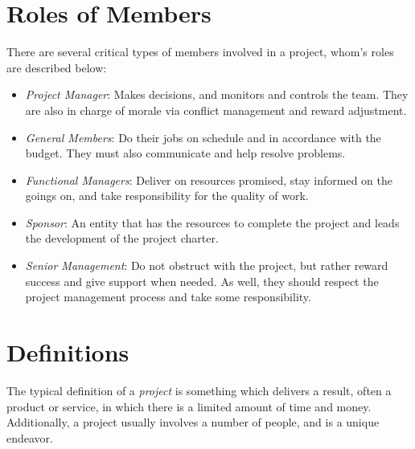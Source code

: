 \documentclass[oneside, 12pt]{book}
\begin{document}
\section{Roles of Members}
There are several critical types of members involved in a project, whom's roles are described below:
\begin{itemize}
    \item \emph{Project Manager}: Makes decisions, and monitors and controls the team. They are also in charge of morale via conflict management and reward adjustment.

    \item \emph{General Members}: Do their jobs on schedule and in accordance with the budget. They must also communicate and help resolve problems.

    \item \emph{Functional Managers}: Deliver on resources promised, stay informed on the goings on, and take responsibility for the quality of work.

    \item \emph{Sponsor}: An entity that has the resources to complete the project and leads the development of the project charter.

    \item \emph{Senior Management}: Do not obstruct with the project, but rather reward success and give support when needed. As well, they should respect the project management process and take some responsibility.
\end{itemize}

\section{Definitions}
The typical definition of a \emph{project} is something which delivers a result, often a product or service, in which there is a limited amount of time and money. Additionally, a project usually involves a number of people, and is a unique endeavor.
\end{document}

